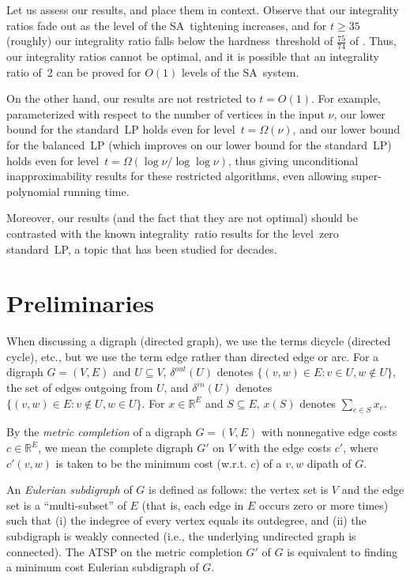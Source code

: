 \documentclass[11pt]{article}
\newcommand{\iSA}{\textsf{SA}}
\newcommand \reals {\mathbb{R}}
\begin{document}
Let us assess our results, and place them in context.
Observe that our integrality ratios fade out as the
level of the \iSA\ tightening increases,
and for $t\ge 35$ (roughly)
our integrality ratio falls below the hardness~threshold of
$\frac{75}{74}$ of \cite{KLS-isaac13}.
Thus, our integrality ratios cannot be optimal, and it is possible
that an integrality ratio of~2 can be proved for $O(1)$ levels
of the \iSA\ system.

On the other hand,  our results are not restricted to $t=O(1)$.
For example, parameterized with respect to the number of vertices in
the input $\nu$, our lower bound for the standard~LP holds even for
level~$t=\Omega(\nu)$, and our lower bound for the balanced~LP
(which improves on our lower bound for the standard~LP)
holds even for level~$t=\Omega(\log\nu / \log\log\nu)$, thus giving
unconditional inapproximability results for these restricted
algorithms, even allowing super-polynomial running time.

Moreover, our results (and the fact that they are not optimal)
should be contrasted with the
known integrality~ratio results for the level~zero standard~LP,
a topic that has been studied for decades.














\section{Preliminaries}

When discussing a digraph (directed graph), we
use the terms dicycle (directed cycle), etc.,
but we use the term edge rather than directed edge or arc.
For a digraph $G=(V,E)$ and $U\subseteq{V}$,
$\delta^{out}(U)$ denotes $\{ (v,w)\in{E}: v\in U, w\not\in U\}$,
the set of edges outgoing from $U$,
and $\delta^{in}(U)$ denotes $\{ (v,w)\in{E}: v\not\in U, w\in U\}$.
For $x\in\reals^{E}$ and $S\subseteq{E}$,
$x(S)$ denotes $\sum_{e\in{S}}x_e$.

By the \textit{metric completion} of a
digraph $G=(V,E)$ with nonnegative edge costs $c\in\reals^E$,
we mean the complete digraph $G'$ on $V$
with the edge costs $c'$,
where $c'(v,w)$ is taken to be the minimum cost (w.r.t. $c$)
of a $v,w$ dipath of $G$.


An \textit{Eulerian subdigraph} of $G$ is defined as follows:
the vertex set is $V$
and the edge set is a ``multi-subset'' of $E$
(that is, each edge in $E$ occurs zero or more times)
such that (i) the indegree of every vertex equals its outdegree, and
(ii) the subdigraph is weakly connected (i.e., the underlying
undirected graph is connected). The ATSP on the metric completion $G'$
of $G$ is equivalent to finding a minimum cost Eulerian subdigraph of
$G$.
\end{document}
